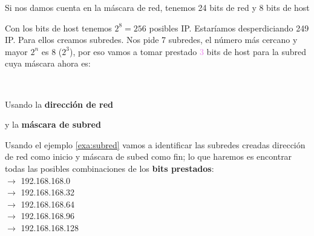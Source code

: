 \documentclass[
	12pt, %
	fleqn, %
	a4paper, %
]{LegrandOrangeBook}
\begin{document}
\begin{example}\label{exa:subred}
Si nos damos cuenta en la máscara de red, tenemos 24 bits de red y 8 bits de host\\
\begin{center}
\end{center}
Con los bits de host tenemos $2^8=256$ posibles IP. Estaríamos desperdiciando 249 IP. Para ellos creamos subredes. Nos pide 7 subredes, el número más cercano y mayor $2^n$ es 8 ($2^3$), por eso vamos a tomar prestado \textcolor{violet}{3} bits de host para la subred cuya máscara ahora es:\\
\begin{center}
\\
\end{center}
Usando la \textbf{dirección de red}\\
\begin{center}
\end{center}
y la \textbf{máscara de subred}\\
\begin{center}
\end{center}
\end{example}
Usando el ejemplo \ref{exa:subred} vamos a identificar las subredes creadas dirección de red como inicio y máscara de subed como fin; lo que haremos es encontrar todas las posibles combinaciones de los \textbf{bits prestados}:\\
$\rightarrow$ 192.168.168.0\\
$\rightarrow$ 192.168.168.32\\
$\rightarrow$ 192.168.168.64\\
$\rightarrow$ 192.168.168.96\\
$\rightarrow$ 192.168.168.128\\
\end{document}
